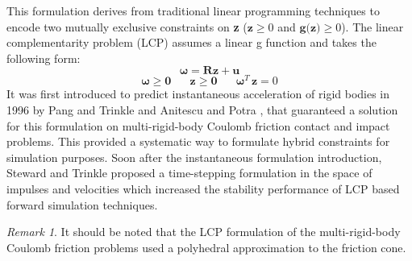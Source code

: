 \documentclass[12,twoside]{TFG-GM}
\theoremstyle{definition}
\theoremstyle{remark}
\newtheorem{remark}[theorem]{Remark}
\begin{document}
This formulation derives from traditional linear programming techniques to encode two mutually exclusive constraints on \textbf{z} ($\textbf{z} \geq 0$ and $\textbf{g(z)} \geq 0$). The linear complementarity problem (LCP) \cite{compconst} assumes a linear g function and takes the following form:
$$\boldsymbol{\omega} = \textbf{R} \textbf{z} + \textbf{u} $$
$$	\boldsymbol{\omega} \geq \textbf{0} \,\,\,\,\,\,\,\,\,\, \textbf{z} \geq \textbf{0} \,\,\,\,\,\,\,\,\,\, \boldsymbol{\omega}^{T} \, \textbf{z} = 0$$
It was first introduced to predict instantaneous acceleration of rigid bodies in 1996 by Pang and Trinkle \cite{lcpi} and Anitescu and Potra \cite{lcc1}, that guaranteed a solution for this formulation on multi-rigid-body Coulomb friction contact and impact problems. This provided a systematic way to formulate hybrid constraints for simulation purposes. Soon after the instantaneous formulation introduction, Steward and Trinkle \cite{lcpd} proposed a time-stepping formulation in the space of impulses and velocities which increased the stability performance of LCP based forward simulation techniques.

\begin{remark}
It should be noted that the LCP formulation of the multi-rigid-body Coulomb friction problems used a polyhedral approximation to the friction cone.
\end{remark}
\end{document}
